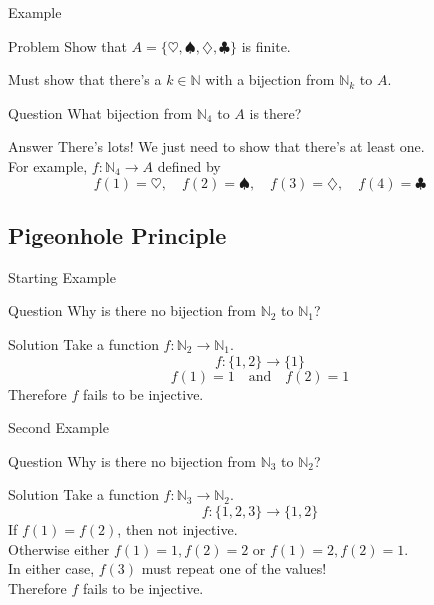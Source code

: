 \documentclass{beamer}
\begin{document}
\begin{frame}{Example}
\begin{block}{Problem}
Show that $A = \{\heartsuit,\spadesuit,\diamondsuit,\clubsuit\}$ is finite.
\end{block}
Must show that there's a $k\in \mathbb N$ with a bijection from $\mathbb N_k$ to $A$.\\
\begin{block}{Question}
What bijection from $\mathbb N_4$ to $A$ is there?
\end{block}
\pause
\begin{block}{Answer}
There's lots!  We just need to show that there's at least one.\\
\pause
For example, $f: \mathbb N_4\rightarrow A$ defined by
$$f(1) = \heartsuit,\quad f(2) = \spadesuit,\quad f(3) = \diamondsuit,\quad f(4) = \clubsuit$$
\end{block}
\end{frame}

\subsection{Pigeonhole Principle}
\begin{frame}{Starting Example}

\pause
\begin{block}{Question}
Why is there no bijection from $\mathbb N_2$ to $\mathbb N_1$?
\end{block}
\pause
\begin{block}{Solution}
\pause
Take a function $f: \mathbb N_2\rightarrow \mathbb N_1$.\\
\pause
$$f: \{1,2\}\rightarrow\{1\}$$
\pause
$$f(1) = 1\quad\text{and}\quad f(2)=1$$
\pause
Therefore $f$ fails to be injective.
\end{block}
\end{frame}

\begin{frame}{Second Example}
\begin{block}{Question}
Why is there no bijection from $\mathbb N_3$ to $\mathbb N_2$?
\end{block}
\pause
\begin{block}{Solution}
\pause
Take a function $f: \mathbb N_3\rightarrow \mathbb N_2$.\\
\pause
$$f: \{1,2,3\}\rightarrow\{1,2\}$$
\pause
If $f(1) = f(2)$, then not injective.\\
\pause
Otherwise either $f(1) = 1,f(2) = 2$ or $f(1) = 2,f(2) =1$.\\
\pause
In either case, $f(3)$ must repeat one of the values!\\
\pause
Therefore $f$ fails to be injective.
\end{block}
\end{frame}
\end{document}
